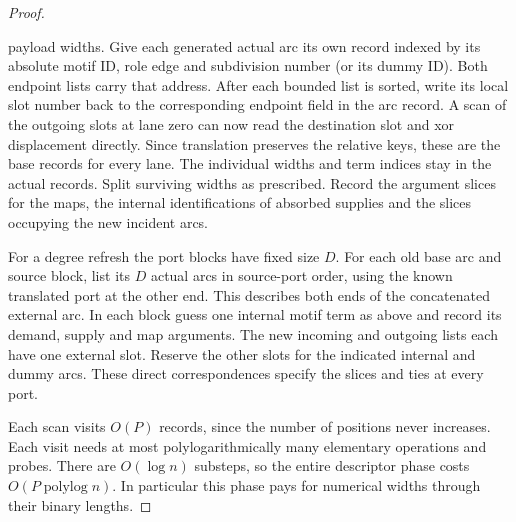 \begin{proof}
\begin{enumerate}
payload widths. Give each generated actual arc its own record indexed
by its absolute motif ID, role edge and subdivision number (or its dummy
ID). Both endpoint lists carry that address. After each bounded list is
sorted, write its local slot number back to the corresponding endpoint
field in the arc record. A scan of the outgoing slots at lane zero can
now read the destination slot and xor displacement directly. Since
translation preserves the relative keys, these are the base records for
every lane. The individual widths and term indices stay in the actual
records. Split surviving widths as prescribed.
Record the argument slices for the maps, the internal identifications of
absorbed supplies and the slices occupying the new incident arcs.
\end{enumerate}
For a degree refresh the port blocks have fixed size $D$. For each old
base arc and source block, list its $D$ actual arcs in source-port order,
using the known translated port at the other end. This describes both
ends of the concatenated external arc. In each block guess one internal
motif term as above and record its demand, supply and map arguments.
The new incoming and outgoing lists each have one external slot. Reserve
the other slots for the indicated internal and dummy arcs. These direct
correspondences specify the slices and ties at every port.

Each scan visits $O(P)$ records, since the number of positions never
increases. Each visit needs at most polylogarithmically many elementary
operations and probes. There are $O(\log n)$ substeps, so the entire
descriptor phase costs $O(P\operatorname{polylog} n)$. In particular this phase pays for numerical widths
through their binary lengths.
\end{proof}
